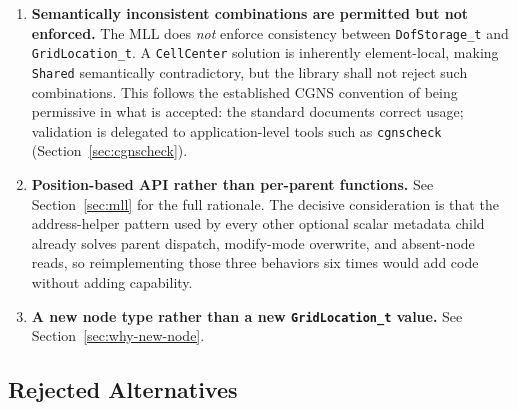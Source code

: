 \documentclass[11pt,letterpaper]{article}
\begin{document}
\begin{enumerate}[leftmargin=2em]
\item \label{dd:permissive} \textbf{Semantically inconsistent
  combinations are permitted but not enforced.}
  The MLL does \emph{not} enforce consistency between
  \texttt{DofStorage\_t} and \texttt{GridLocation\_t}.
  A \texttt{CellCenter} solution is inherently element-local, making
  \texttt{Shared} semantically contradictory, but the library
  shall not reject such combinations.  This follows the established
  CGNS convention of being permissive in what is accepted: the
  standard documents correct usage; validation is delegated to
  application-level tools such as \texttt{cgnscheck}
  (Section~\ref{sec:cgnscheck}).

\item \textbf{Position-based API rather than per-parent functions.}
  See Section~\ref{sec:mll} for the full rationale.  The decisive
  consideration is that the address-helper pattern used by every other
  optional scalar metadata child already solves parent dispatch,
  modify-mode overwrite, and absent-node reads, so reimplementing
  those three behaviors six times would add code without adding
  capability.

\item \textbf{A new node type rather than a new
  \texttt{GridLocation\_t} value.}  See
  Section~\ref{sec:why-new-node}.

\end{enumerate}

\subsection{Rejected Alternatives}
\end{document}
